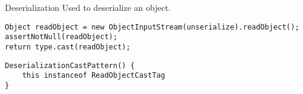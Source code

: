 
\begin{pattern}{Deserialization}
Used to deserialize an object.

\instances


\begin{lstlisting}[style=java,caption={Instance of the \pname{} pattern  (\url{http://bit.ly/2KOpj3A}) }]
Object readObject = new ObjectInputStream(unserialize).readObject();
assertNotNull(readObject);
return type.cast(readObject);
\end{lstlisting}

\detection

\begin{lstlisting}[style=ql]
DeserializationCastPattern() {
    this instanceof ReadObjectCastTag
}
\end{lstlisting}

\end{pattern}
